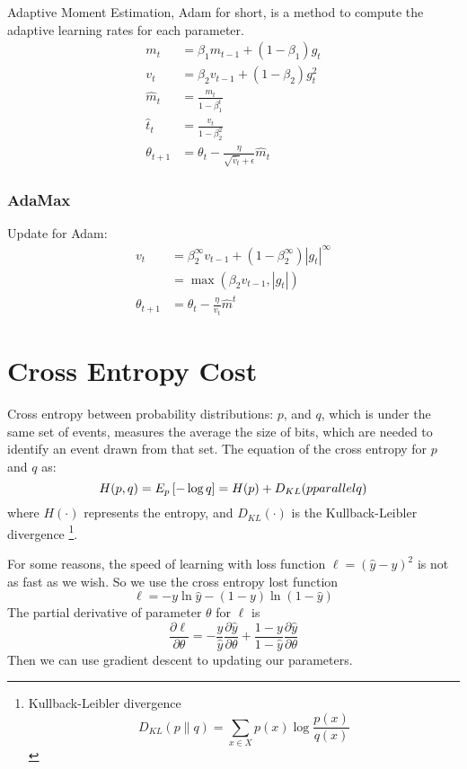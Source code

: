 \documentclass{article}
\begin{document}
Adaptive Moment Estimation, Adam for short, is a method to compute the adaptive learning rates for each parameter.
\begin{align*}
m_t &= \beta_1m_{t-1}+(1-\beta_1)g_t \\
v_t &= \beta_2v_{t-1} + (1-\beta_2)g_t^2 \\
\hat{m}_t &= \frac{m_t}{1-\beta^t_1} \\
\hat{t}_t &= \frac{v_t}{1-\beta_2^2} \\
\theta_{t+1} &= \theta_t - \frac{\eta}{\sqrt{\hat{v}_t}+\epsilon}\hat{m}_t
\end{align*}

\subsubsection{AdaMax}
\label{sec:gd:gdoa:adamax}

Update for Adam:
\begin{align*}
v_t &=\beta^\infty_2v_{t-1}+(1-\beta_2^{\infty})|g_t|^\infty \\
	  &= \max(\beta_2v_{t-1},|g_t|) \\
\theta_{t+1} &= \theta_t - \frac{\eta}{v_t}\hat{m}^t
\end{align*}




\section{Cross Entropy Cost}
\label{sec:cec}

Cross entropy between probability distributions: $p$, and $q$, which is under the same set of events, measures the average
the size of bits, which are needed to identify an event drawn from that set.
The equation of the cross entropy for $p$ and $q$ as:
\[
H(p,q) = E_p\left[-\log{q}\right] = H(p) + D_{KL}(p\\parallel q)
\] 
where $H(\cdot)$ represents the entropy, and $D_{KL}(\cdot)$ is the Kullback-Leibler divergence%
\footnote{ Kullback-Leibler divergence
	\[
	D_{KL}(p\parallel q) = \sum\limits_{x \in X}p(x)\log\frac{p(x)}{q(x)}
	\]
}.

For some reasons, the speed of learning with loss function $\ell = (\hat{y}-y)^2$ is not as fast as we wish.
So we use the cross entropy lost function
\[
\ell = - y\ln{\hat{y}}-(1-y)\ln{(1-\hat{y})}
\]
The partial derivative of parameter $\theta$ for $\ell$ is 
\[
\frac{\partial \ell}{\partial \theta} = - \frac{y}{\hat{y}}\frac{\partial\hat{y}}{\partial\theta} + \frac{1-y}{1-\hat{y}}\frac{\partial\hat{y}}{\partial \theta}
\] 
Then we can use gradient descent to updating our parameters.
\end{document}
